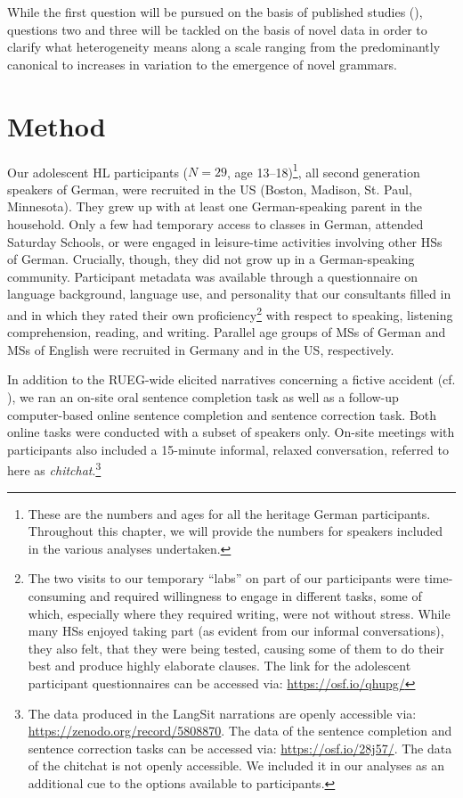 \documentclass[output=paper]{langscibook}
\begin{document}
While the first question will be pursued on the basis of published studies (\citealt{PashkovaEtAl2022, Tsehaye2023, TsehayeEtAl2021}), questions two and three will be tackled on the basis of novel data in order to clarify what heterogeneity means along a scale ranging from the predominantly canonical to increases in variation to the emergence of novel grammars.

\section{Method}\label{sec:tsehaye:4}

Our adolescent HL participants ($N=29$, age 13--18)\footnote{These are the numbers and ages for all the heritage German participants. Throughout this chapter, we will provide the numbers for speakers included in the various analyses undertaken.}, all second generation speakers of German, were recruited in the US (Boston, Madison, St. Paul, Minnesota). They grew up with at least one German-speaking parent in the household. Only a few had temporary access to classes in German, attended Saturday Schools, or were engaged in leisure-time activities involving other HSs of German. Crucially, though, they did not grow up in a German-speaking community. Participant metadata was available through a questionnaire on language background, language use, and personality that our consultants filled in and in which they rated their own proficiency\footnote{The two visits to our temporary “labs” on part of our participants were time-consuming and required willingness to engage in different tasks, some of which, especially where they required writing, were not without stress. While many HSs enjoyed taking part (as evident from our informal conversations), they also felt, that they were being tested, causing some of them to do their best and produce highly elaborate clauses. The link for the adolescent participant questionnaires can be accessed via: \url{https://osf.io/qhupg/}} with respect to speaking, listening comprehension, reading, and writing. Parallel age groups of MSs of German and MSs of English were recruited in Germany and in the US, respectively. 

In addition to the RUEG-wide elicited narratives concerning a fictive accident (cf. ), we ran an on-site oral sentence completion task as well as a follow-up computer-based online sentence completion and sentence correction task. Both online tasks were conducted with a subset of speakers only. On-site meetings with participants also included a 15-minute informal, relaxed conversation, referred to here as \textit{chitchat}.\footnote{The data produced in the LangSit narrations are openly accessible via: \url{https://zenodo.org/record/5808870}. The data of the sentence completion and sentence correction tasks can be accessed via: \url{https://osf.io/28j57/}. The data of the chitchat is not openly accessible. We included it in our analyses as an additional cue to the options available to participants.}
\end{document}
